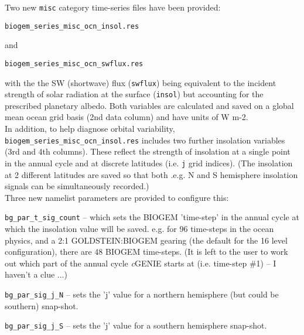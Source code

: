 \documentclass[10pt,twoside]{article}
\begin{document}
Two new \texttt{misc} category time-series files have been provided:
\vspace{-10pt}\begin{verbatim}biogem_series_misc_ocn_insol.res\end{verbatim}\vspace{-10pt}
and
\vspace{-10pt}\begin{verbatim}biogem_series_misc_ocn_swflux.res\end{verbatim}\vspace{-10pt}
with the the SW (shortwave) flux (\texttt{swflux}) being equivalent to the incident strength of solar radiation at the surface (\texttt{insol}) but accounting for the prescribed planetary albedo. Both variables are calculated and saved on a global mean ocean grid basis (2nd data column) and have units of W m-2.
\\In addition, to help diagnose orbital variability, \texttt{biogem\_series\_misc\_ocn\_insol.res} includes two further insolation variables (3rd and 4th columns). These reflect the strength of insolation at a single point in the annual cycle and at discrete latitudes (i.e. \texttt{j} grid indices). (The insolation at 2 different latitudes are saved so that both .e.g. N and S hemisphere insolation signals can be simultaneously recorded.)
\\Three new namelist parameters are provided to configure this:
\begin{compactenum}
	\item \texttt{bg\_par\_t\_sig\_count} -- which sets the BIOGEM 'time-step' in the annual cycle at which the insolation value will be saved. e.g. for 96 time-steps in the ocean physics, and a 2:1 GOLDSTEIN:BIOGEM gearing (the default for the 16 level configuration), there are 48 BIOGEM time-steps. (It is left to the user to work out which part of the annual cycle \textit{c}GENIE starts at (i.e. time-step \#1) -- I haven't a clue ...)
	\item \texttt{bg\_par\_sig\_j\_N} -- sets the 'j' value for a northern hemisphere (but could be southern) snap-shot.
	\item \texttt{bg\_par\_sig\_j\_S} -- sets the 'j' value for a southern hemisphere snap-shot.
\end{compactenum}


\end{document}
